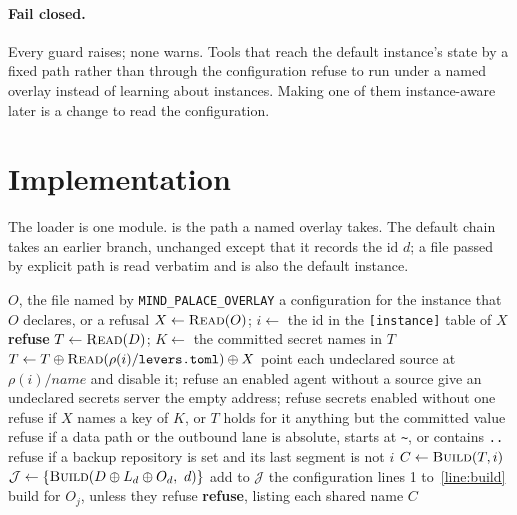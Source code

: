 \documentclass[11pt]{article}
\theoremstyle{plain}
\theoremstyle{definition}
\theoremstyle{remark}
\newcommand{\env}{\texttt{MIND\_PALACE\_OVERLAY}}
\begin{document}
\paragraph{Fail closed.} Every guard raises; none warns. Tools that reach the default instance's
state by a fixed path rather than through the configuration refuse to run under a named overlay
instead of learning about instances. Making one of them instance-aware later is a change to read
the configuration.

\section{Implementation}\label{sec:impl}

The loader is one module.  is the path a named overlay takes. The default chain takes
an earlier branch, unchanged except that it records the id $d$; a file passed by explicit path is
read verbatim and is also the default instance.

\begin{algorithm}
\caption{Loading a named overlay.}\label{alg:load}
\begin{algorithmic}[1]
\Require $O$, the file named by \env
\Ensure a configuration for the instance that $O$ declares, or a refusal
\State $X \gets \Call{Read}{O}$; \quad $i \gets$ the id in the \texttt{[instance]} table of $X$
 \textbf{refuse} \EndIf
\State $T \gets \Call{Read}{D}$; \quad $K \gets$ the committed secret names in $T$
\State $T \gets T \oplus \Call{Read}{\rho(i)/\texttt{levers.toml}} \oplus X$
\State point each undeclared source at $\rho(i)/\mathit{name}$ and disable it; refuse an enabled
  agent without a source
\State give an undeclared secrets server the empty address; refuse secrets enabled without one
\State refuse if $X$ names a key of $K$, or $T$ holds for it anything but the committed value
  \label{line:secret}
\State refuse if a data path or the outbound lane is absolute, starts at \texttt{\textasciitilde},
  or contains \texttt{..}
\State refuse if a backup repository is set and its last segment is not $i$
\State $C \gets \Call{Build}{T, i}$ 
  \label{line:build}
\State $\mathcal{J} \gets \{\Call{Build}{D \oplus L_d \oplus O_d,\ d}\}$ 
  \State add to $\mathcal{J}$ the configuration lines 1 to~\ref{line:build} build for $O_j$, unless
    they refuse
\EndFor
{}
   \label{line:refuse}
    \textbf{refuse}, listing each shared name
  \EndIf
\EndFor
\State \Return $C$
\end{algorithmic}
\end{algorithm}
\end{document}
